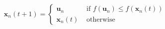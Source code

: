 \begin{equation}
\mathbf{x}_{n}(t+1)=\left\{\begin{array}{ll}{\mathbf{u}_{n}} & {\text { if } f\left(\mathbf{u}_{n}\right) \leq f\left(\mathbf{x}_{n}(t)\right)} \\ {\mathbf{x}_{n}(t)} & {\text { otherwise }}\end{array}\right.
\label{selection}
\end{equation}